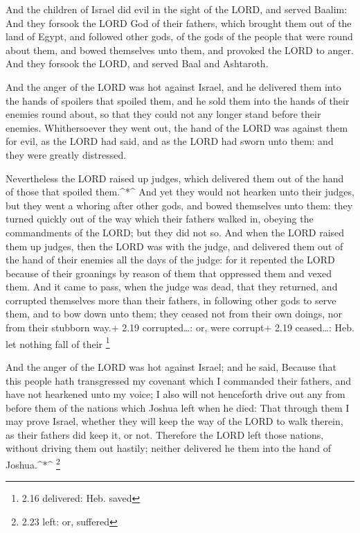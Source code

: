  And the children of Israel did evil in the sight of the
LORD, and served Baalim:  And they forsook the LORD God of
their fathers, which brought them out of the land of Egypt, and followed
other gods, of the gods of the people that were round about them, and
bowed themselves unto them, and provoked the LORD to anger.
 And they forsook the LORD, and served Baal and Ashtaroth.

 And the anger of the LORD was hot against Israel, and he
delivered them into the hands of spoilers that spoiled them, and he sold
them into the hands of their enemies round about, so that they could not
any longer stand before their enemies.  Whithersoever they
went out, the hand of the LORD was against them for evil, as the LORD
had said, and as the LORD had sworn unto them: and they were greatly
distressed.

 Nevertheless the LORD raised up judges, which delivered
them out of the hand of those that spoiled them.\^{}*\^{} 
And yet they would not hearken unto their judges, but they went a
whoring after other gods, and bowed themselves unto them: they turned
quickly out of the way which their fathers walked in, obeying the
commandments of the LORD; but they did not so.  And when
the LORD raised them up judges, then the LORD was with the judge, and
delivered them out of the hand of their enemies all the days of the
judge: for it repented the LORD because of their groanings by reason of
them that oppressed them and vexed them.  And it came to
pass, when the judge was dead, that they returned, and corrupted
themselves more than their fathers, in following other gods to serve
them, and to bow down unto them; they ceased not from their own doings,
nor from their stubborn way.+ 2.19 corrupted\ldots: or, were corrupt+
2.19 ceased\ldots: Heb. let nothing fall of their \footnote{2.16
  delivered: Heb. saved}

 And the anger of the LORD was hot against Israel; and he
said, Because that this people hath transgressed my covenant which I
commanded their fathers, and have not hearkened unto my voice;
 I also will not henceforth drive out any from before them
of the nations which Joshua left when he died:  That
through them I may prove Israel, whether they will keep the way of the
LORD to walk therein, as their fathers did keep it, or not.
 Therefore the LORD left those nations, without driving
them out hastily; neither delivered he them into the hand of
Joshua.\^{}*\^{} \footnote{2.23 left: or, suffered}

